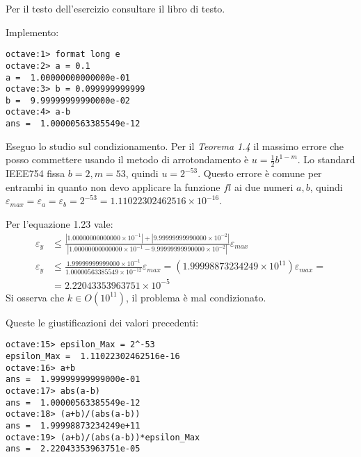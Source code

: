 \begin{exercise}[1.18]
Per il testo dell'esercizio consultare il libro di testo.
\end{exercise}
Implemento:
\begin{lstlisting}
octave:1> format long e
octave:2> a = 0.1
a =  1.00000000000000e-01
octave:3> b = 0.099999999999
b =  9.99999999990000e-02
octave:4> a-b
ans =  1.00000563385549e-12
\end{lstlisting}
Eseguo lo studio sul condizionamento. Per il \emph{Teorema 1.4} il massimo errore
che posso commettere usando il metodo di arrotondamento \`e $u = \frac{1}{2}b^{1-m}$.
Lo standard IEEE754 fissa $b = 2, m = 53$, quindi $u = 2^{-53}$. Questo errore
\`e comune per entrambi in quanto non devo applicare la funzione $fl$ ai due numeri $a, b$,
quindi $\varepsilon_{max} = \varepsilon_{a} = \varepsilon_{b} = 2^{-53} = 
1.11022302462516 \times 10^{-16}$.

Per l'equazione 1.23 vale:
\begin{displaymath}
\begin{split}
	\varepsilon_{y} & \leq \frac{|1.00000000000000 \times 10^{-1}| + 
			|9.99999999990000 \times 10^{-2}|}
		{|1.00000000000000 \times 10^{-1} - 
			9.99999999990000 \times 10^{-2}|}\varepsilon_{max} \\
	\varepsilon_{y} & \leq \frac{1.99999999999000\times 10^{-1}}
		{1.00000563385549\times 10^{-12}}\varepsilon_{max} = 
		(1.99998873234249\times 10^{11})\varepsilon_{max} = \\
	& = 2.22043353963751\times 10^{-5}
\end{split}
\end{displaymath}
Si osserva che $k \in O(10^{11})$, il problema \`e mal condizionato.

Queste le giustificazioni dei valori precedenti:
\begin{lstlisting}
octave:15> epsilon_Max = 2^-53
epsilon_Max =  1.11022302462516e-16
octave:16> a+b
ans =  1.99999999999000e-01
octave:17> abs(a-b)
ans =  1.00000563385549e-12
octave:18> (a+b)/(abs(a-b))
ans =  1.99998873234249e+11
octave:19> (a+b)/(abs(a-b))*epsilon_Max
ans =  2.22043353963751e-05
\end{lstlisting}
















